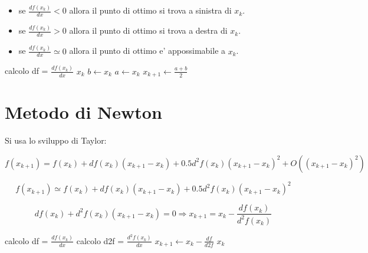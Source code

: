 \begin{itemize}
    \item se $\frac {df(x_k)} {dx} < 0$ allora il punto di ottimo si trova a sinistra di $x_k$.
    \item se $\frac {df(x_k)} {dx} > 0$ allora il punto di ottimo si trova a destra di $x_k$.
    \item se $\frac {df(x_k)} {dx} \simeq 0$ allora il punto di ottimo e' appossimabile a $x_k$.
\end{itemize}

\begin{algorithm}
    \begin{algorithmic}
                \State calcolo df = $\frac {df(x_k)} {dx}$
                    \State \Return $x_k$
                \Else
                        \State $b \gets x_k$
                    \Else
                        \State $a \gets x_k$
                    \EndIf
                \EndIf
                \State $x_{k+1} \gets \frac {a + b} 2$
            \EndWhile
        \EndProcedure
    \end{algorithmic}
\end{algorithm}

\section{Metodo di Newton}

Si usa lo sviluppo di Taylor:

\[
    f(x_{k+1}) = f(x_k) + df(x_k)(x_{k+1} - x_k) + 0.5 d^2f(x_k)(x_{k+1} - x_k)^2 + O((x_{k+1} - x_k)^2)
\]

\[
    f(x_{k+1}) \simeq f(x_k) + df(x_k)(x_{k+1} - x_k) + 0.5 d^2f(x_k)(x_{k+1} - x_k)^2
\]

\[
    df(x_k) + d^2f(x_k)(x_{k+1} - x_k) = 0 \Rightarrow x_{k+1} = x_k - \frac {df(x_k)} {d^2f(x_k)}
\]

\begin{algorithm}
    \begin{algorithmic}
                \State calcolo df = $\frac {df(x_k)} {dx}$
                \State calcolo d2f = $\frac {d^2f(x_k)} {dx}$
                \State $x_{k+1} \gets x_k - \frac {df} {d2f}$
                    \State \Return $x_k$
                \EndIf
            \EndWhile
        \EndProcedure
    \end{algorithmic}
\end{algorithm}

